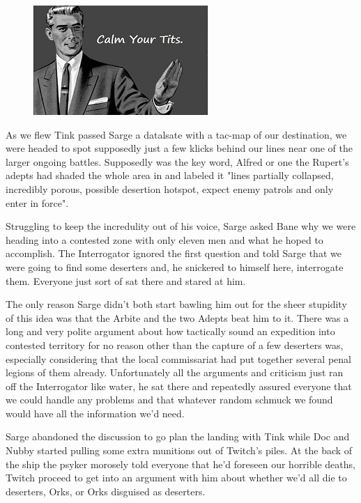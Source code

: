 \begin{figure}
	\begin{center}
		\includegraphics[width=\figwidth]{pics/9/14.png}
	\end{center}
\end{figure}
As we flew Tink passed Sarge a datalsate with a tac-map of our destination, we were headed to spot supposedly just a few klicks behind our lines near one of the larger ongoing battles. 
Supposedly was the key word, Alfred or one the Rupert's adepts had shaded the whole area in and labeled it "lines partially collapsed, incredibly porous, possible desertion hotspot, expect enemy patrols and only enter in force". 


Struggling to keep the incredulity out of his voice, Sarge asked Bane why we were heading into a contested zone with only eleven men and what he hoped to accomplish. 
The Interrogator ignored the first question and told Sarge that we were going to find some deserters and, he snickered to himself here, interrogate them. 
Everyone just sort of sat there and stared at him.

The only reason Sarge didn't both start bawling him out for the sheer stupidity of this idea was that the Arbite and the two Adepts beat him to it. 
There was a long and very polite argument about how tactically sound an expedition into contested territory for no reason other than the capture of a few deserters was, especially considering that the local commissariat had put together several penal legions of them already. 
Unfortunately all the arguments and criticism just ran off the Interrogator like water, he sat there and repeatedly assured everyone that we could handle any problems and that whatever random schmuck we found would have all the information we'd need.

Sarge abandoned the discussion to go plan the landing with Tink while Doc and Nubby started pulling some extra munitions out of Twitch's piles. 
At the back of the ship the psyker morosely told everyone that he'd foreseen our horrible deaths, Twitch proceed to get into an argument with him about whether we'd all die to deserters, Orks, or Orks disguised as deserters.

